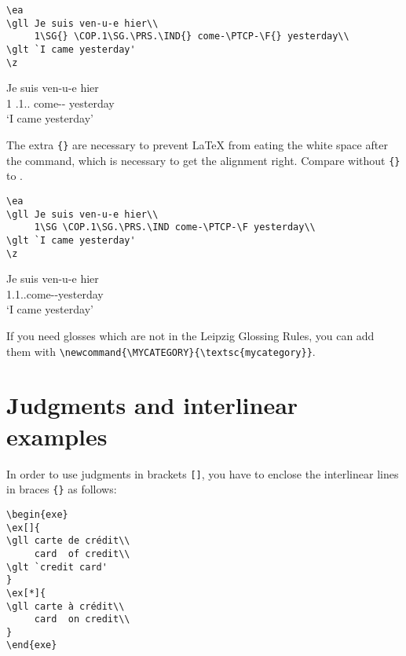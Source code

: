 \documentclass[output=paper]{langscibook}
\newcommand{\cmd}[1]{\texttt{\textbackslash#1}}
\begin{document}
\begin{lstlisting}
\ea
\gll Je suis ven-u-e hier\\
     1\SG{} \COP.1\SG.\PRS.\IND{} come-\PTCP-\F{} yesterday\\
\glt `I came yesterday'     
\z
 \end{lstlisting}
\ea\label{ex:correctalignment}
\gll Je suis ven-u-e hier\\
     1\SG{} \COP.1\SG.\PRS.\IND{} come-\PTCP-\F{} yesterday\\
\glt `I came yesterday'     
\z

The extra \texttt{\{\}} are necessary to prevent {\LaTeX} from eating the white space after the command, which is necessary to get the alignment right. Compare  without \texttt{\{\}} to .

\begin{lstlisting}
\ea
\gll Je suis ven-u-e hier\\
     1\SG \COP.1\SG.\PRS.\IND come-\PTCP-\F yesterday\\
\glt `I came yesterday'     
\z
 \end{lstlisting}
\ea\label{ex:wrongalignment}
\gll Je suis ven-u-e hier\\
     1\SG \COP.1\SG.\PRS.\IND come-\PTCP-\F yesterday\\
\glt `I came yesterday'     
\z   

If you need glosses which are not in the Leipzig Glossing Rules, you can add them with \cmd{newcommand\{}\cmd{MYCATEGORY\}\{}\cmd{textsc\{mycategory\}\}}.


\section{Judgments and interlinear examples}
In order to use judgments in brackets \texttt{[]}, you have to enclose the interlinear lines in braces \texttt{\{\}} as follows:

\begin{minipage}[t]{.55\textwidth}
\begin{lstlisting}
\begin{exe}
\ex[]{
\gll carte de crédit\\ 
     card  of credit\\ 
\glt `credit card'     
}
\ex[*]{
\gll carte à crédit\\ 
     card  on credit\\  
}
\end{exe}
 \end{lstlisting}
\end{minipage}~
\parbox[t]{.45\textwidth}{ 
\begin{exe}
\end{exe}
}
\end{document}
